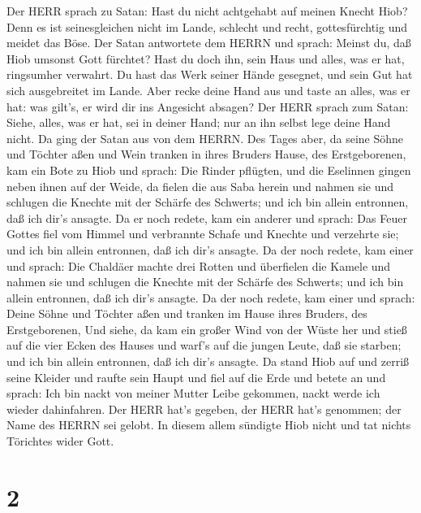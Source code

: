  Der HERR sprach zu Satan: Hast du nicht achtgehabt auf
meinen Knecht Hiob? Denn es ist seinesgleichen nicht im Lande, schlecht
und recht, gottesfürchtig und meidet das Böse.  Der Satan
antwortete dem HERRN und sprach: Meinst du, daß Hiob umsonst Gott
fürchtet?  Hast du doch ihn, sein Haus und alles, was er
hat, ringsumher verwahrt. Du hast das Werk seiner Hände gesegnet, und
sein Gut hat sich ausgebreitet im Lande.  Aber recke deine
Hand aus und taste an alles, was er hat: was gilt's, er wird dir ins
Angesicht absagen?  Der HERR sprach zum Satan: Siehe,
alles, was er hat, sei in deiner Hand; nur an ihn selbst lege deine Hand
nicht. Da ging der Satan aus von dem HERRN.  Des Tages
aber, da seine Söhne und Töchter aßen und Wein tranken in ihres Bruders
Hause, des Erstgeborenen,  kam ein Bote zu Hiob und sprach:
Die Rinder pflügten, und die Eselinnen gingen neben ihnen auf der Weide,
 da fielen die aus Saba herein und nahmen sie und schlugen
die Knechte mit der Schärfe des Schwerts; und ich bin allein entronnen,
daß ich dir's ansagte.  Da er noch redete, kam ein anderer
und sprach: Das Feuer Gottes fiel vom Himmel und verbrannte Schafe und
Knechte und verzehrte sie; und ich bin allein entronnen, daß ich dir's
ansagte.  Da der noch redete, kam einer und sprach: Die
Chaldäer machte drei Rotten und überfielen die Kamele und nahmen sie und
schlugen die Knechte mit der Schärfe des Schwerts; und ich bin allein
entronnen, daß ich dir's ansagte.  Da der noch redete, kam
einer und sprach: Deine Söhne und Töchter aßen und tranken im Hause
ihres Bruders, des Erstgeborenen,  Und siehe, da kam ein
großer Wind von der Wüste her und stieß auf die vier Ecken des Hauses
und warf's auf die jungen Leute, daß sie starben; und ich bin allein
entronnen, daß ich dir's ansagte.  Da stand Hiob auf und
zerriß seine Kleider und raufte sein Haupt und fiel auf die Erde und
betete an  und sprach: Ich bin nackt von meiner Mutter
Leibe gekommen, nackt werde ich wieder dahinfahren. Der HERR hat's
gegeben, der HERR hat's genommen; der Name des HERRN sei gelobt.
 In diesem allem sündigte Hiob nicht und tat nichts
Törichtes wider Gott.

\hypertarget{section-1}{%
\section{2}\label{section-1}}

